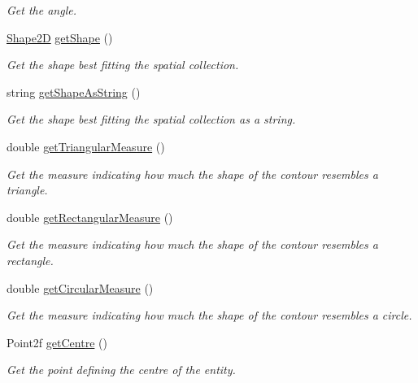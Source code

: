 \begin{DoxyCompactItemize}
\begin{DoxyCompactList}\small\item\em Get the angle. \end{DoxyCompactList}\item 
\hyperlink{namespacemultiscale_1_1analysis_ad895735ef4c40ec7f58424c33cba1b88}{Shape2\-D} \hyperlink{classmultiscale_1_1analysis_1_1SpatialEntityPseudo3D_af67de0727472a72bad311e71db8a1115}{get\-Shape} ()
\begin{DoxyCompactList}\small\item\em Get the shape best fitting the spatial collection. \end{DoxyCompactList}\item 
string \hyperlink{classmultiscale_1_1analysis_1_1SpatialEntityPseudo3D_aaf8b45d68041be0f293eaf1bf40c76d3}{get\-Shape\-As\-String} ()
\begin{DoxyCompactList}\small\item\em Get the shape best fitting the spatial collection as a string. \end{DoxyCompactList}\item 
double \hyperlink{classmultiscale_1_1analysis_1_1SpatialEntityPseudo3D_a9c7af7e1fc6a829c184c85baeaf1ebc2}{get\-Triangular\-Measure} ()
\begin{DoxyCompactList}\small\item\em Get the measure indicating how much the shape of the contour resembles a triangle. \end{DoxyCompactList}\item 
double \hyperlink{classmultiscale_1_1analysis_1_1SpatialEntityPseudo3D_a924e390a408a91abf394f29bec33d945}{get\-Rectangular\-Measure} ()
\begin{DoxyCompactList}\small\item\em Get the measure indicating how much the shape of the contour resembles a rectangle. \end{DoxyCompactList}\item 
double \hyperlink{classmultiscale_1_1analysis_1_1SpatialEntityPseudo3D_a71759aa55f43ac2a6cc52b738f3b2c42}{get\-Circular\-Measure} ()
\begin{DoxyCompactList}\small\item\em Get the measure indicating how much the shape of the contour resembles a circle. \end{DoxyCompactList}\item 
Point2f \hyperlink{classmultiscale_1_1analysis_1_1SpatialEntityPseudo3D_a4976534b2cdf55541701a7d5ea4ac0c5}{get\-Centre} ()
\begin{DoxyCompactList}\small\item\em Get the point defining the centre of the entity. \end{DoxyCompactList}\item 

\end{DoxyCompactItemize}
